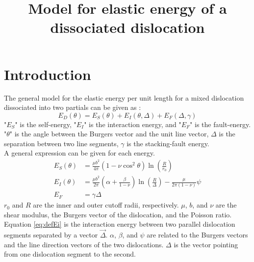 \documentclass[10pt,a4paper,draft]{article}
\title{Model for elastic energy of a dissociated dislocation}
\begin{document}
\section{Introduction}

The general model for the elastic energy per unit length for a mixed dislocation dissociated into two partials can be given as \cite{bacon78}:
\begin{equation}
E_D(\theta) = E_S(\theta) + E_I(\theta,\Delta) + E_F(\Delta,\gamma) \label{eqbacon}
\end{equation}
"$E_S$" is the self-energy, "$E_I$" is the interaction energy, and "$E_F$" is the fault-energy. "$\theta$" is the angle between the Burgers vector and the unit line vector, $\Delta$ is the separation between two line segments, $\gamma$ is the stacking-fault energy.\\

A general expression can be given for each energy.
\begin{subequations}
\begin{align}
E_S(\theta) & = \frac{\mu b^2}{4\pi}\left(1-\nu\cos^2\theta\right)\ln\left(\frac{R}{r_0}\right) \label{eq:ltmodel}\\
E_I(\theta) & = \frac{\mu b^2}{2\pi}\left(\alpha+\frac{\beta}{1-\nu}\right)\ln\left(\frac{R}{\Delta}\right)-\frac{\mu}{2\pi(1-\nu)}\psi \label{eq:defEi}\\
E_F & = \gamma \Delta \label{eq:defEf}
\end{align}
\end{subequations}
$r_0$ and $R$ are the inner and outer cutoff radii, respectively. $\mu$, $b$, and $\nu$ are the shear modulus, the Burgers vector of the dislocation, and the Poisson ratio.\\

Equation \ref{eq:defEi} is the interaction energy between two parallel dislocation segments separated by a vector $\vec{\Delta}$. $\alpha$, $\beta$, and $\psi$ are related to the Burgers vectors and the line direction vectors of the two dislocations. $\Delta$ is the vector pointing from one dislocation segment to the second.
\end{document}
